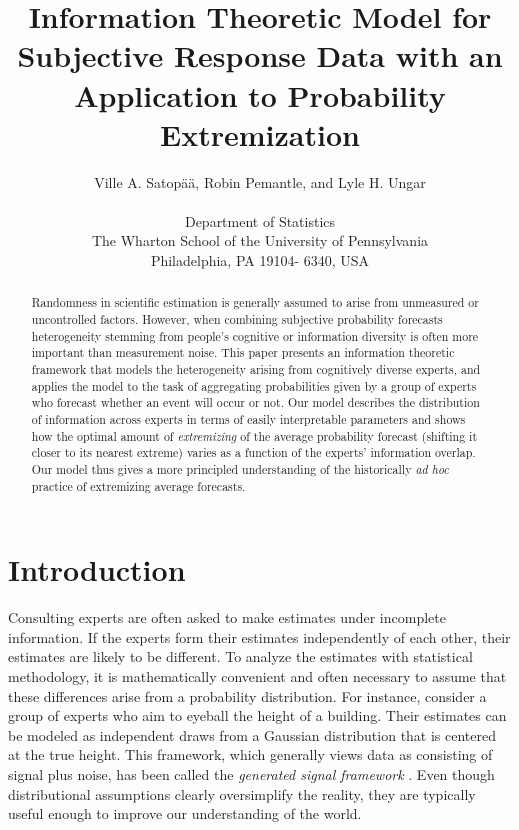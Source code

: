 \documentclass[11pt,twoside]{article}
\begin{document}
\title{Information Theoretic Model for Subjective Response Data with an Application to Probability Extremization}
\author{
Ville A. Satop\"a\"a, Robin Pemantle, and Lyle H. Ungar\\
\\
 \small Department of Statistics\\
 \small The Wharton School of the University of Pennsylvania\\
 \small Philadelphia, PA 19104- 6340, USA\\ [-0.25in]} \date{}
\maketitle

\pagestyle{myheadings}
\thispagestyle{empty}

\begin{abstract}
Randomness in scientific estimation is generally assumed to arise from
unmeasured or uncontrolled factors. However, when combining subjective probability forecasts heterogeneity stemming from people's cognitive or information diversity is often
more important than measurement noise.  This paper presents an
information theoretic framework that models the heterogeneity arising
from cognitively diverse experts, and applies the model to the task of
aggregating probabilities given by a group of experts who forecast
whether an event will occur or not. Our model describes the
distribution of information across experts in terms of easily
interpretable parameters and shows how the optimal amount
of \textit{extremizing} of the average probability forecast (shifting
it closer to its nearest extreme) varies as a function of the experts'
information overlap.  Our model thus gives a more principled
understanding of the historically {\it ad hoc} practice of extremizing
average forecasts.
\end{abstract}



\section{Introduction}

Consulting experts are often asked to make estimates under incomplete
information. If the experts form their estimates independently of each
other, their estimates are likely to be different. To analyze the
estimates with statistical methodology, it is mathematically
convenient and often necessary to assume that these differences arise
from a probability distribution. For instance, consider a group of
experts who aim to eyeball the height of a building. Their estimates
can be modeled as independent draws from a Gaussian distribution that
is centered at the true height. This framework, which generally views data as consisting of signal plus noise,
has been called the \textit{generated signal framework}  \cite{hong2009interpreted}. Even though distributional
assumptions clearly oversimplify the reality, they are typically
useful enough to improve our understanding of the world.
\end{document}
